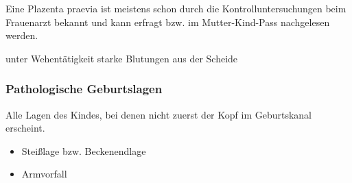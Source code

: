 Eine Plazenta praevia ist meistens schon durch die Kontrolluntersuchungen beim
Frauenarzt bekannt und kann erfragt bzw. im Mutter-Kind-Pass nachgelesen werden.

unter Wehentätigkeit starke Blutungen aus der Scheide


% 
% 
% 
% 
% 
% 
% 
% 
% 
% 
% 
% 
% 
% 
% 
% 

\subsubsection{Pathologische Geburtslagen}


Alle Lagen des Kindes, bei denen nicht zuerst der Kopf im Geburtskanal erscheint.
\begin{itemize}
	\item Steißlage bzw. Beckenendlage
	\item Armvorfall
\end{itemize}

